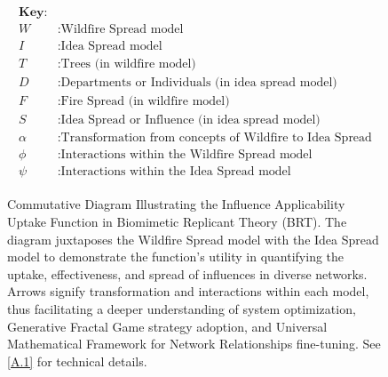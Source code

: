\documentclass[sn-nature]{sn-jnl}%
\theoremstyle{thmstyleone}%
\theoremstyle{thmstyletwo}%
\theoremstyle{thmstylethree}%
\begin{document}
\begin{figure}[H]
\begin{minipage}{0.3\textwidth}
\end{minipage}
\begin{minipage}{0.5\textwidth}
\begin{align*}
\boxed{
\begin{aligned}
\textbf{Key:} \\
W & : \text{Wildfire Spread model} \\
I & : \text{Idea Spread model} \\
T & : \text{Trees (in wildfire model)} \\
D & : \text{Departments or Individuals (in idea spread model)} \\
F & : \text{Fire Spread (in wildfire model)} \\
S & : \text{Idea Spread or Influence (in idea spread model)} \\
\alpha & : \text{Transformation from concepts of Wildfire to Idea Spread} \\
\phi & : \text{Interactions within the Wildfire Spread model} \\
\psi & : \text{Interactions within the Idea Spread model}
\end{aligned}
}
\end{align*}

\end{minipage}
\label{marker}
\caption[Influence Applicability Uptake Function Diagram]{Commutative Diagram Illustrating the Influence Applicability Uptake Function in Biomimetic Replicant Theory (BRT). The diagram juxtaposes the Wildfire Spread model with the Idea Spread model to demonstrate the function's utility in quantifying the uptake, effectiveness, and spread of influences in diverse networks. Arrows signify transformation and interactions within each model, thus facilitating a deeper understanding of system optimization, Generative Fractal Game strategy adoption, and Universal Mathematical Framework for Network Relationships fine-tuning. See \ref{A.1} for technical details.}
\end{figure}
\end{document}
